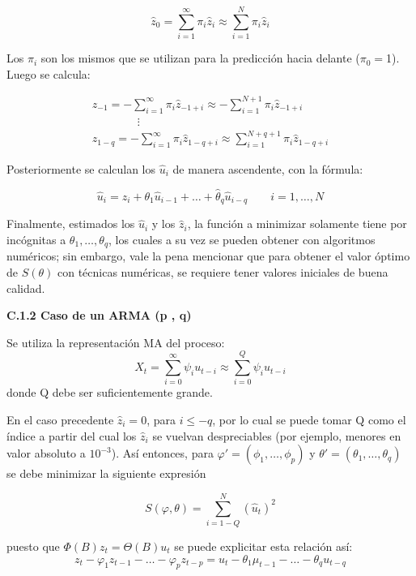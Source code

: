\[
\hat{z}_{0} =\sum_{i=1}^{\infty} \pi_{i} \hat{z}_{i} \approx \sum_{i=1}^N \pi_{i} \hat{z}_{i} 
\]

Los $\pi_{i}$ son los mismos que se utilizan para la predicci\'{o}n hacia delante ($\pi_{0}=$1). Luego se calcula:

\begin{align*}
\hat{z}_{-1} =-\sum_{i=1}^{\infty} \pi_{i} \hat{z}_{-1+i} \approx - \sum_{i=1}^{N+1} \pi_{i} \hat{z}_{-1+i} \\ 
\qquad\qquad \vdots \\ 
\hat{z}_{1-q} =-\sum_{i=1}^{\infty} \pi_{i} \hat{z}_{1-q+i} \approx \sum_{i=1}^{N+q+1} \pi_{i} \hat{z}_{1-q+i}
\end{align*}

Posteriormente se calculan los $\hat{u}_{i}$ de manera ascendente, con la f\'{o}rmula:

\[
\hat{u}_{i} =z_{i} +\theta_{1} \hat{u}_{i-1} +\ldots +\hat{\theta}_{q} \hat{u}_{i-q} \qquad i=1,\ldots,N
\]

Finalmente, estimados los $\hat{u}_{i}$ y los $\hat{z}_{i}$, la funci\'{o}n a minimizar solamente tiene por inc\'{o}gnitas a $\theta_{1},\ldots, \theta_{q}$, los cuales a su vez se pueden obtener con algoritmos num\'{e}ricos; sin embargo, vale la pena mencionar que para obtener el valor \'{o}ptimo de $S(\theta)$ con t\'{e}cnicas num\'{e}ricas, se requiere tener valores iniciales de buena calidad.\newline

\textbf{C.1.2 Caso de un ARMA (p , q)}\newline

Se utiliza la representaci\'{o}n MA del proceso:
\[
X_{t} =\sum_{i=0}^{\infty} \psi_{i} u_{t-i} \approx \sum_{i=0}^{Q} \psi_{i} u_{t-i} 
\]
donde Q debe ser suficientemente grande.\newline

En el caso precedente $\hat{z}_{i}=0$, para $i\leq -q$, por lo cual se puede tomar Q como el \'{i}ndice a partir del cual los $\hat{z}_{i}$ se vuelvan despreciables (por ejemplo, menores en valor absoluto a $10^{-3}$). As\'{i} entonces, para $\varphi '= (\phi_{1},\ldots,\phi_{p})$ y $\theta '= (\theta_{1},\ldots,\theta_{q})$ se debe minimizar la siguiente expresi\'{o}n 

\[
S(\varphi ,\theta )=\sum_{i=1-Q}^N (\hat{u}_{t})^{2}
\]

puesto que $\Phi(B)z_{t} =\Theta (B)u_{t}$ se puede explicitar esta relaci\'{o}n as\'{i}:
\[
z_{t} -\varphi_{1} z_{t-1} -\ldots -\varphi_{p} z_{t-p} =u_{t} -\theta_{1} \mu_{t-1} -\ldots -\theta_{q} u_{t-q} 
\]

